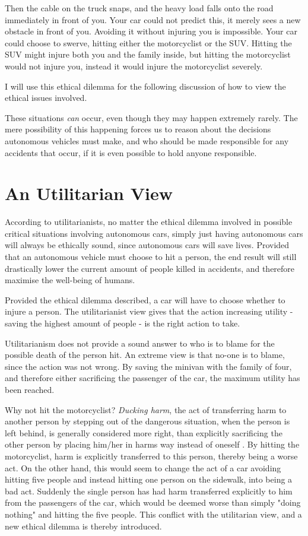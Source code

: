 Then the cable on the truck snaps, and the heavy load falls onto the road immediately in front of you. Your car could not predict this, it merely sees a new obstacle in front of you. Avoiding it without injuring you is impossible. Your car could choose to swerve, hitting either the motorcyclist or the SUV. Hitting the SUV might injure both you and the family inside, but hitting the motorcyclist would not injure you, instead it would injure the motorcyclist severely.

I will use this ethical dilemma for the following discussion of how to view the ethical issues involved. 

These situations \textit{can} occur, even though they may happen extremely rarely. The mere possibility of this happening forces us to reason about the decisions autonomous vehicles must make, and who should be made responsible for any accidents that occur, if it is even possible to hold anyone responsible. 

\section{An Utilitarian View}
\newpar According to utilitarianists, no matter the ethical dilemma involved in possible critical situations involving autonomous cars, simply just having autonomous cars will always be ethically sound, since autonomous cars will save lives. Provided that an autonomous vehicle must choose to hit a person, the end result will still drastically lower the current amount of people killed in accidents, and therefore maximise the well-being of humans. 

Provided the ethical dilemma described, a car will have to choose whether to injure a person. The utilitarianist view gives that the action increasing utility - saving the highest amount of people - is the right action to take. 

Utilitarianism does not provide a sound answer to who is to blame for the possible death of the person hit. An extreme view is that no-one is to blame, since the action was not wrong. By saving the minivan with the family of four, and therefore either sacrificing the passenger of the car, the maximum utility has been reached. 

\newpar Why not hit the motorcyclist? \textit{Ducking harm}, the act of transferring harm to another person by stepping out of the dangerous situation, when the person is left behind, is generally considered more right, than explicitly sacrificing the other person by placing him/her in harms way instead of oneself \cite{10.2307/2027067}. By hitting the motorcyclist, harm is explicitly transferred to this person, thereby being a worse act.   
On the other hand, this would seem to change the act of a car avoiding hitting five people and instead hitting one person on the sidewalk, into being a bad act. Suddenly the single person has had harm transferred explicitly to him from the passengers of the car, which would be deemed worse than simply "doing nothing" and hitting the five people. This conflict with the utilitarian view, and a new ethical dilemma is thereby introduced.     

